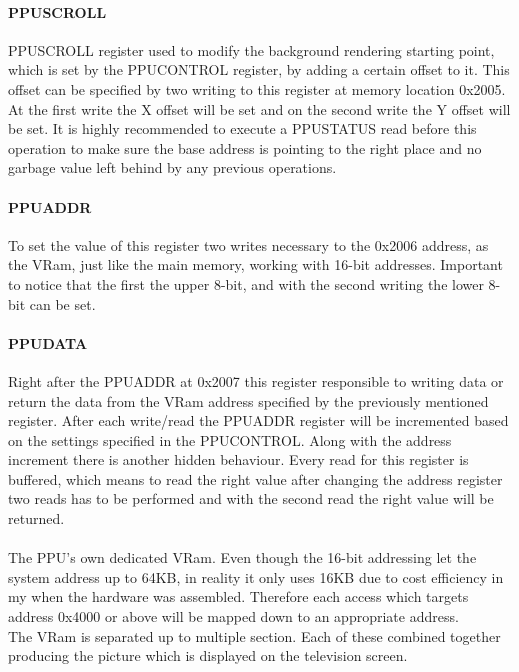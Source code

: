 \documentclass[]{report}
\begin{document}
\paragraph{PPUSCROLL}
PPUSCROLL register used to modify the background rendering starting point, which is set by the PPUCONTROL register, by adding a certain offset to it. This offset can be specified by two writing to this register at memory location 0x2005. At the first write the X offset will be set and on the second write the Y offset will be set. It is highly recommended to execute a PPUSTATUS read before this operation to make sure the base address is pointing to the right place and no garbage value left behind by any previous operations.

\paragraph{PPUADDR}
To set the value of this register two writes necessary to the 0x2006 address, as the VRam, just like the main memory, working with 16-bit addresses. Important to notice that the first the upper 8-bit, and with the second writing the lower 8-bit can be set.

\paragraph{PPUDATA}
Right after the PPUADDR at 0x2007 this register responsible to writing data or return the data from the VRam address specified by the previously mentioned register. After each write/read the PPUADDR register will be incremented based on the settings specified in the PPUCONTROL. Along with the address increment there is another hidden behaviour. Every read for this register is buffered, which means to read the right value after changing the address register two reads has to be performed and with the second read the right value will be returned.

\paragraph{ } 
The PPU's own dedicated VRam. Even though the 16-bit addressing let the system address up to 64KB,  in reality it only uses 16KB due to cost efficiency in my when the hardware was assembled.
Therefore each access which targets address 0x4000 or above will be mapped down to an appropriate address.
\\
The VRam is separated up to multiple section. Each of these combined together producing the picture which is displayed on the television screen.
\end{document}
